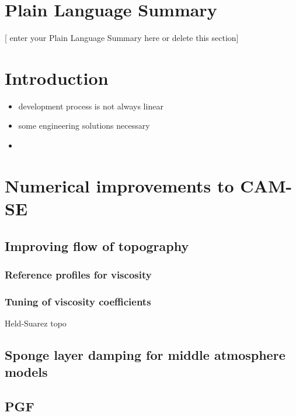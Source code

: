 \documentclass[draft]{agujournal2019}
\begin{document}
\section*{Plain Language Summary}
[ enter your Plain Language Summary here or delete this section]


%
%

\section{Introduction}
\begin{itemize}
\item development process is not always linear
\item some engineering solutions necessary
\item 
\end{itemize}
%


\section{Numerical improvements to CAM-SE}
\subsection{Improving flow of topography}
\subsubsection{Reference profiles for viscosity}
\subsubsection{Tuning of viscosity coefficients}
Held-Suarez topo
\subsection{Sponge layer damping for middle atmosphere models}
\subsection{PGF}
%
%
%
\end{document}
